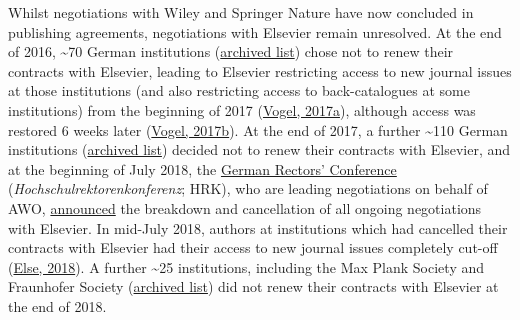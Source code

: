 \documentclass[
]{article}
\begin{document}
Whilst negotiations with Wiley and Springer Nature have now concluded in publishing agreements, negotiations with Elsevier remain unresolved. At the end of 2016, \textasciitilde70 German institutions (\href{https://web.archive.org/web/20191212094238/https://www.projekt-deal.de/vertragskuendigungen_elsevier/}{archived list}) chose not to renew their contracts with Elsevier, leading to Elsevier restricting access to new journal issues at those institutions (and also restricting access to back-catalogues at some institutions) from the beginning of 2017 (\href{https://doi.org/10.1126/science.355.6320.17}{Vogel, 2017a}), although access was restored 6 weeks later (\href{https://doi.org/10.1126/science.aal0753}{Vogel, 2017b}). At the end of 2017, a further \textasciitilde110 German institutions (\href{https://web.archive.org/web/20191212094842/https://www.projekt-deal.de/vertragskundigungen-elsevier-2017/}{archived list}) decided not to renew their contracts with Elsevier, and at the beginning of July 2018, the \href{https://www.hrk.de/}{German Rectors' Conference} (\emph{Hochschulrektorenkonferenz}; HRK), who are leading negotiations on behalf of AWO, \href{https://web.archive.org/web/20191212113744/https://www.hrk.de/presse/pressemitteilungen/pressemitteilung/meldung/verhandlungen-von-deal-und-elsevier-elsevier-forderungen-sind-fuer-die-wissenschaft-inakzeptabel-440/}{announced} the breakdown and cancellation of all ongoing negotiations with Elsevier. In mid-July 2018, authors at institutions which had cancelled their contracts with Elsevier had their access to new journal issues completely cut-off (\href{https://doi.org/10.1038/d41586-018-05754-1}{Else, 2018}). A further \textasciitilde25 institutions, including the Max Plank Society and Fraunhofer Society (\href{https://web.archive.org/web/20191114074949/https://www.projekt-deal.de/vertragskundigungen-elsevier-2018/}{archived list}) did not renew their contracts with Elsevier at the end of 2018.
\end{document}
